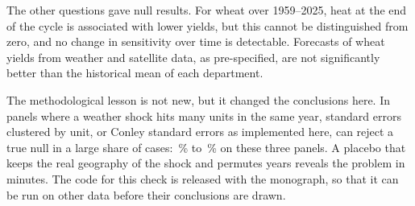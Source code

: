 The other questions gave null results. For wheat over 1959--2025, heat at the end of the cycle is associated with lower yields, but this cannot be distinguished from zero, and no change in sensitivity over time is detectable. Forecasts of wheat yields from weather and satellite data, as pre-specified, are not significantly better than the historical mean of each department.

The methodological lesson is not new, but it changed the conclusions here. In panels where a weather shock hits many units in the same year, standard errors clustered by unit, or Conley standard errors as implemented here, can reject a true null in a large share of cases: \UsualSizeMin\,\% to \UsualSizeMax\,\% on these three panels. A placebo that keeps the real geography of the shock and permutes years reveals the problem in minutes. The code for this check is released with the monograph, so that it can be run on other data before their conclusions are drawn.

